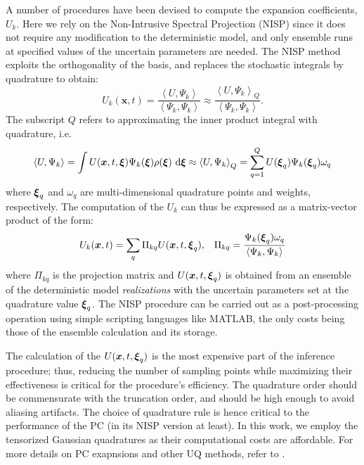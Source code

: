 A number of procedures have been devised to compute the expansion coefficients,
$U_k$. Here we rely on the Non-Intrusive Spectral Projection (NISP) 
since it does not require any modification to the deterministic model, and only
ensemble runs at specified values of the uncertain parameters are needed.
The NISP method
exploits the orthogonality of the basis, and replaces the
stochastic integrals by quadrature to obtain:
\begin{equation}
 U_k(\bm{x},t) = \frac{\left< U, \Psi_k \right>}{\left< \Psi_k, \Psi_k \right>}
         \approx \frac{\left< U, \Psi_k \right>_Q}{\left< \Psi_k, \Psi_k \right>} .
\end{equation}
The subscript $Q$ refers to approximating the inner product integral with
quadrature, i.e.
\begin{equation}
  \left< U, \Psi_k \right> = \int U(\bm{x},t,\xxi) \Psi_k(\xxi) \rho(\xxi) \mbox{ d}\xxi
\approx \left< U, \Psi_k \right>_Q
= \sum_{q=1}^Q U(\xxi_q) \Psi_k(\xxi_q) \omega_q
\end{equation}
where $\xxi_q$ and $\omega_q$ are multi-dimensional quadrature points and weights,
respectively.
The computation of the ${U}_k$ can thus be expressed as a matrix-vector product of the form:
\begin{equation} 
 U_k(\bm{x},t)=\sum_q \Pi_{kq} U(\bm{x},t,\xxi_q),\;\;\;
 \Pi_{kq}=\frac{\Psi_k(\xxi_q)\omega_q}{\left< \Psi_k, \Psi_k \right>}
\end{equation} 
where $\Pi_{kq}$ is the projection matrix and $U(\bm{x},t,\xxi_q)$ is obtained
from an ensemble of the deterministic model {\em realizations} with the uncertain parameters set at
the quadrature value $\xxi_q$. The NISP procedure can be carried out as a post-processing
operation using simple scripting languages like MATLAB, the only costs being those of the
ensemble calculation and its storage.

The calculation of the $U(\bm{x},t,\xxi_q)$ is the most expensive part of the
inference procedure; thus, reducing the number of sampling points
while maximizing their effectiveness is critical for the procedure's
efficiency.  The quadrature order should be commensurate with the
truncation order, and should be high enough to avoid aliasing artifacts.
The choice of quadrature rule is hence critical to the performance
of the PC (in its NISP version at least). In this work, we employ the 
tensorized Gaussian
quadratures as their computational costs are affordable.
For more details on PC exapnsions and other UQ methods,
refer to \citep{LeMaitreKnio2010}.
